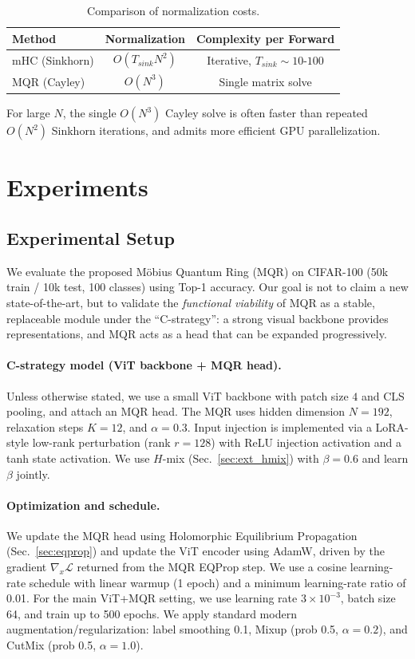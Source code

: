 \documentclass[11pt,a4paper]{article}
\newcommand{\LL}{\mathcal{L}}
\begin{document}
\begin{table}[h]
\centering
\begin{tabular}{lcc}
\toprule
\textbf{Method} & \textbf{Normalization} & \textbf{Complexity per Forward} \\
\midrule
mHC (Sinkhorn) & $O(T_{sink} N^2)$ & Iterative, $T_{sink} \sim 10$-$100$ \\
MQR (Cayley) & $O(N^3)$ & Single matrix solve \\
\bottomrule
\end{tabular}
\caption{Comparison of normalization costs.}
\label{tab:comparison}
\end{table}

For large $N$, the single $O(N^3)$ Cayley solve is often faster than repeated $O(N^2)$ Sinkhorn iterations, and admits more efficient GPU parallelization.

\section{Experiments}
\label{sec:experiments}

\subsection{Experimental Setup}
\label{sec:exp_setup}

We evaluate the proposed Möbius Quantum Ring (MQR) on CIFAR-100 (50k train / 10k test, 100 classes) using Top-1 accuracy.
Our goal is not to claim a new state-of-the-art, but to validate the \emph{functional viability} of MQR as a stable, replaceable module under the ``C-strategy'': a strong visual backbone provides representations, and MQR acts as a head that can be expanded progressively.

\paragraph{C-strategy model (ViT backbone + MQR head).}
Unless otherwise stated, we use a small ViT backbone with patch size $4$ and CLS pooling, and attach an MQR head.
The MQR uses hidden dimension $N=192$, relaxation steps $K=12$, and $\alpha=0.3$.
Input injection is implemented via a LoRA-style low-rank perturbation (rank $r=128$) with ReLU injection activation and a tanh state activation.
We use $H$-mix (Sec.~\ref{sec:ext_hmix}) with $\beta=0.6$ and learn $\beta$ jointly.

\paragraph{Optimization and schedule.}
We update the MQR head using Holomorphic Equilibrium Propagation (Sec.~\ref{sec:eqprop}) and update the ViT encoder using AdamW, driven by the gradient $\nabla_x\LL$ returned from the MQR EQProp step.
We use a cosine learning-rate schedule with linear warmup (1 epoch) and a minimum learning-rate ratio of 0.01.
For the main ViT+MQR setting, we use learning rate $3\times 10^{-3}$, batch size 64, and train up to 500 epochs.
We apply standard modern augmentation/regularization: label smoothing 0.1, Mixup (prob 0.5, $\alpha=0.2$), and CutMix (prob 0.5, $\alpha=1.0$).
\end{document}
